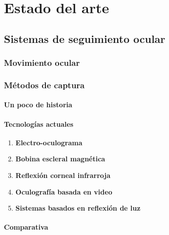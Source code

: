 \documentclass[../main.tex]{subfiles}
\begin{document}
		
\chapter{Estado del arte}
\label{cha:02_02_estado_del_arte}
\section{Sistemas de seguimiento ocular}
\label{sec:02_sistemas_de_seguimiento_ocular}
	\subsection{Movimiento ocular}
	\label{sub:02_movimiento_ocular}
	
	\subsection{Métodos de captura}
	\label{sub:02_métodos_de_captura}
		\subsubsection{Un poco de historia}
		\label{ssub:02_un_poco_de_historia}

		\subsubsection{Tecnologías actuales}
		\label{ssub:02_tecnologías_actuales}
			\begin{enumerate}
				\item \textbf{Electro-oculograma}

				\item \textbf{Bobina escleral magnética}

				\item \textbf{Reflexión corneal infrarroja}

				\item \textbf{Oculografía basada en video}

				\item \textbf{Sistemas basados en reflexión de luz}

			\end{enumerate}

		\subsubsection{Comparativa}
		\label{ssub:02_comparativa_eyetracker}
		
\end{document}
